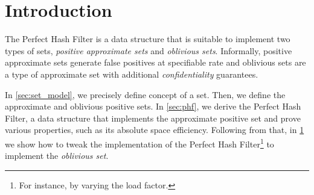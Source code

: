 \documentclass[ ../main.tex]{subfiles}
\begin{document}
\section{Introduction}
The Perfect Hash Filter is a data structure that is suitable to implement two types of sets, \emph{positive approximate sets}\cite{aset} and \emph{oblivious sets}\cite{obset}. Informally, positive approximate sets generate false positives at specifiable rate and oblivious sets are a type of approximate set with additional \emph{confidentiality} guarantees.

In \cref{sec:set_model}, we precisely define concept of a set. Then, we define the approximate and oblivious positive sets. In \cref{sec:phf}, we derive the Perfect Hash Filter, a data structure that implements the approximate positive set and prove various properties, such as its absolute space efficiency. Following from that, in \cref{} we show how to tweak the implementation of the Perfect Hash Filter\footnote{For instance, by varying the load factor.} to implement the \emph{oblivious set}. 
\end{document}
